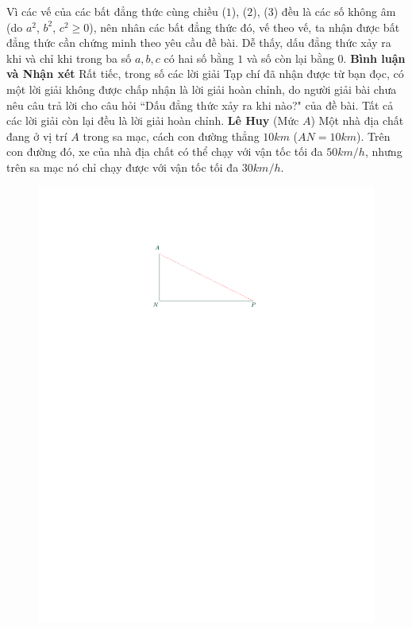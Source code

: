 \begin{multicols}{2}
	Vì các vế của các bất đẳng thức cùng chiều ($1$), ($2$), ($3$) đều là các số không âm (do  $a^2$, $b^2$, $c^2 \ge 0$), nên nhân các bất đẳng thức đó, vế theo vế, ta nhận được bất đẳng thức cần chứng minh theo yêu cầu đề bài.
	\vskip 0.05cm
	Dễ thấy, dấu đẳng thức xảy ra khi và chỉ khi trong ba số $a, b, c$ có hai số bằng $1$ và số còn lại bằng $0$.
	\vskip 0.05cm
	\textbf{\color{thachthuctoanhoc}Bình luận và Nhận xét}
	\vskip 0.05cm
	Rất tiếc, trong số các lời giải Tạp chí đã nhận được từ bạn đọc, có một lời giải không được chấp nhận là lời giải hoàn chỉnh, do người giải bài chưa nêu câu trả lời cho câu hỏi ``Dấu đẳng thức xảy ra khi nào?" của đề bài. Tất cả các lời giải còn lại đều là lời giải hoàn chỉnh.
	\vskip 0.05cm
	\hfill	\textbf{\color{thachthuctoanhoc}Lê Huy}
	\vskip 0.05cm
	{}
	(Mức $A$) Một nhà địa chất đang ở vị trí $A$ trong sa mạc, cách con đường thẳng $10km$ ($AN = 10km$). Trên con đường đó, xe của nhà địa chất có thể chạy với vận tốc tối đa $50km/h$, nhưng trên sa mạc nó chỉ chạy được với vận tốc tối đa $30km/h$.
	\begin{figure}[H]
		\centering
		\vspace*{-10pt}
		\captionsetup{labelformat= empty, justification=centering}
		\includegraphics[width=.8\linewidth]{P597}
		\vspace*{-10pt}

\end{figure}
\end{multicols}
